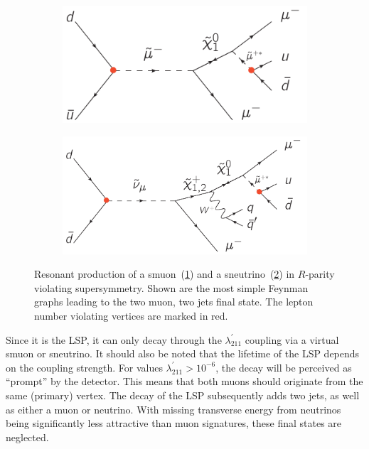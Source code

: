 \begin{figure}[ht!]
  \centering
  \begin{subfigure}[b]{0.495\textwidth}
    \centering
    \includegraphics[width=\textwidth]{plots/rpv-resonant-smuon-samesign-mumuqq.pdf}
    \caption{\label{fig:ressmu}}
  \end{subfigure}
  \begin{subfigure}[b]{0.495\textwidth}
    \centering
    \includegraphics[width=\textwidth]{plots/rpv-resonant-sneutrino-chargino-mumuqq.pdf}
    \caption{\label{fig:ressneu}}
  \end{subfigure}
  \caption{Resonant production of a smuon~(\ref{fig:ressmu}) and a sneutrino~(\ref{fig:ressneu}) in $R$-parity violating supersymmetry. Shown are the most simple Feynman graphs leading to the two muon, two jets final state. The lepton number violating vertices are marked in red.}
  \label{fig:resosmusneu}
\end{figure}

Since it is the LSP, it can only decay through the $\lambda^\prime_{211}$ coupling via a virtual smuon or sneutrino. It should also be noted that the lifetime of the LSP depends on the coupling strength. For values $\lambda^\prime_{211} > 10^{-6}$, the decay will be perceived as ``prompt'' by the detector. This means that both muons should originate from the same (primary) vertex. The decay of the LSP subsequently adds two jets, as well as either a muon or neutrino. With missing transverse energy from neutrinos being significantly less attractive than muon signatures, these final states are neglected. 

